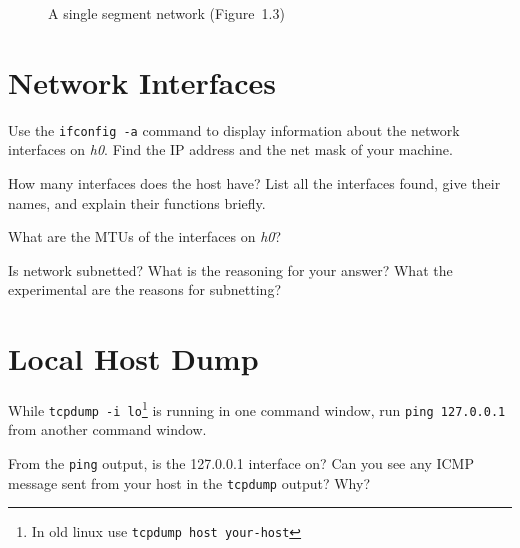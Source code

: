 \documentclass{../UTNetLab}
\begin{document}
\begin{center}
\begin{minipage}{0.48\textwidth}
\begin{flushright}
\begin{figure}[H]
                    \caption{A single segment network (Figure~1.3)}\label{fig:1.3}
                \end{figure}
            \end{flushright}
        \end{minipage}
    \end{center}

\section{Network Interfaces}
    Use the \lstinline{ifconfig -a} command to display information about the network interfaces on \textit{h0}.
    Find the IP address and the net mask of your machine.
    
    \begin{report}
    \item How many interfaces does the host have?
    List all the interfaces found, give their names, and explain their functions briefly.

    \item What are the MTUs of the interfaces on \textit{h0}?

    \item Is network subnetted?
    What is the reasoning for your answer? What the experimental are the reasons for subnetting?
    \end{report}


\section{Local Host Dump}
    While \lstinline[emph={lo}]{tcpdump -i lo}\footnote{In old linux use \lstinline[emph={your-host}]{tcpdump host your-host}} is running in one command window, run \lstinline{ping 127.0.0.1} from another command window.

    \begin{report}
    \item From the \lstinline{ping} output, is the 127.0.0.1 interface on?
    Can you see any ICMP message sent from your host in the \lstinline{tcpdump} output?
    Why?
    \end{report}
\end{document}
